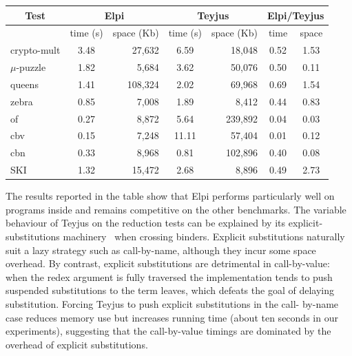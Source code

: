 \documentclass{these-ISSS}
\begin{document}
\begin{center}
  \scriptsize 
  \begin{tabular}{|p{1.5cm}||c|r||c|r||c|c|}
    \hline
      \multicolumn{1}{|c||}{Test} &
      \multicolumn{2}{|c||}{Elpi} &
      \multicolumn{2}{|c||}{Teyjus} &
      \multicolumn{2}{|c|}{Elpi/Teyjus} \\
    \hline
    &  time (s)     & space (Kb)  & time (s) & space (Kb) &  time & space \\
    \hline
    \hline
    crypto-mult &  3.48 & 27,632  & 6.59 & 18,048 &  0.52 & 1.53 \\
    \hline    
    $\mu$-puzzle &  1.82 & 5,684 &  3.62 & 50,076 &  0.50 & 0.11 \\
    \hline
    queens &  1.41  & 108,324 &  2.02 & 69,968 &  0.69 & 1.54 \\
    \hline    
    zebra &  0.85 & 7,008 &  1.89 & 8,412 &  0.44 & 0.83 \\
    \hline     
    \hline
    of &  0.27 & 8,872 &  5.64 & 239,892 &  0.04 & 0.03 \\
    \hline
    cbv &  0.15 & 7,248 &  11.11 & 57,404  & 0.01 & 0.12 \\
    \hline
    cbn &  0.33 & 8,968 &  0.81 & 102,896  & 0.40 & 0.08 \\
    \hline
    \hline
    SKI &  1.32 & 15,472 &  2.68 & 8,896  & 0.49 & 2.73 \\
    \hline
    
  \end{tabular}
\end{center}

The results reported in the table show that Elpi performs particularly well
on programs inside \thefragment{} and remains competitive on the other
benchmarks. The variable behaviour of Teyjus on the reduction tests can be
explained by its explicit-substitutions machinery~\cite{NADATHUR200235} when
crossing binders. Explicit substitutions naturally suit a lazy strategy
such as call-by-name, although they incur some space overhead. By contrast,
explicit substitutions are detrimental in call-by-value: when the redex
argument is fully traversed the implementation tends to push suspended
substitutions to the term leaves, which defeats the goal of delaying
substitution. Forcing Teyjus to push explicit substitutions in the call-
by-name case reduces memory use but increases running time (about ten
seconds in our experiments), suggesting that the call-by-value timings are
dominated by the overhead of explicit substitutions.
\end{document}
